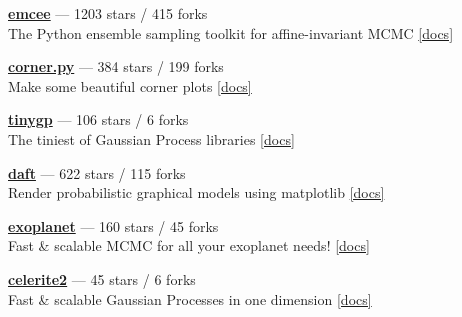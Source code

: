 \item \href{https://github.com/dfm/emcee}{{\bf emcee}} --- 1203 stars / 415 forks \\
The Python ensemble sampling toolkit for affine-invariant MCMC \href{https://emcee.readthedocs.io}{[docs]}

\item \href{https://github.com/dfm/corner.py}{{\bf corner.py}} --- 384 stars / 199 forks \\
Make some beautiful corner plots \href{http://corner.readthedocs.io}{[docs]}

\item \href{https://github.com/dfm/tinygp}{{\bf tinygp}} --- 106 stars / 6 forks \\
The tiniest of Gaussian Process libraries \href{https://tinygp.readthedocs.io}{[docs]}

\item \href{https://github.com/daft-dev/daft}{{\bf daft}} --- 622 stars / 115 forks \\
Render probabilistic graphical models using matplotlib \href{https://docs.daft-pgm.org}{[docs]}

\item \href{https://github.com/exoplanet-dev/exoplanet}{{\bf exoplanet}} --- 160 stars / 45 forks \\
Fast {\&} scalable MCMC for all your exoplanet needs!  \href{https://docs.exoplanet.codes}{[docs]}

\item \href{https://github.com/exoplanet-dev/celerite2}{{\bf celerite2}} --- 45 stars / 6 forks \\
Fast {\&} scalable Gaussian Processes in one dimension \href{https://celerite2.readthedocs.io}{[docs]}